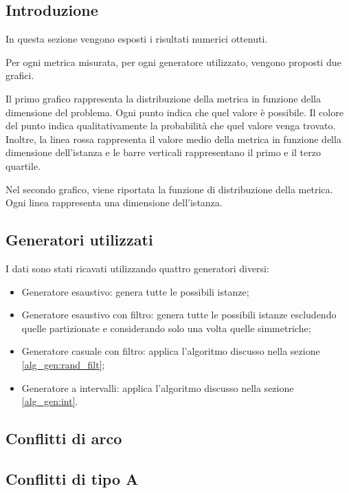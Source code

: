 \documentclass[../../relazione.tex]{subfiles}
\begin{document}
\subsection{Introduzione}
In questa sezione vengono esposti i risultati numerici ottenuti.

Per ogni metrica misurata, per ogni generatore utilizzato, vengono proposti due grafici.

Il primo grafico rappresenta la distribuzione della metrica in funzione della dimensione del problema.
Ogni punto indica che quel valore è possibile.
Il colore del punto indica qualitativamente la probabilità che quel valore venga trovato.
Inoltre, la linea rossa rappresenta il valore medio della metrica in funzione della dimensione dell'istanza e le barre verticali rappresentano il primo e il terzo quartile.

Nel secondo grafico, viene riportata la funzione di distribuzione della metrica.
Ogni linea rappresenta una dimensione dell'istanza.

\subsection{Generatori utilizzati}
I dati sono stati ricavati utilizzando quattro generatori diversi:
\begin{itemize}
    \item Generatore esaustivo: genera tutte le possibili istanze;
    \item Generatore esaustivo con filtro: genera tutte le possibili istanze escludendo quelle partizionate e considerando solo una volta quelle simmetriche;
    \item Generatore casuale con filtro: applica l'algoritmo discusso nella sezione \ref{alg_gen:rand_filt};
    \item Generatore a intervalli: applica l'algoritmo discusso nella sezione \ref{alg_gen:int}.
\end{itemize}

\subsection{Conflitti di arco}

\subsection{Conflitti di tipo A}
\end{document}
